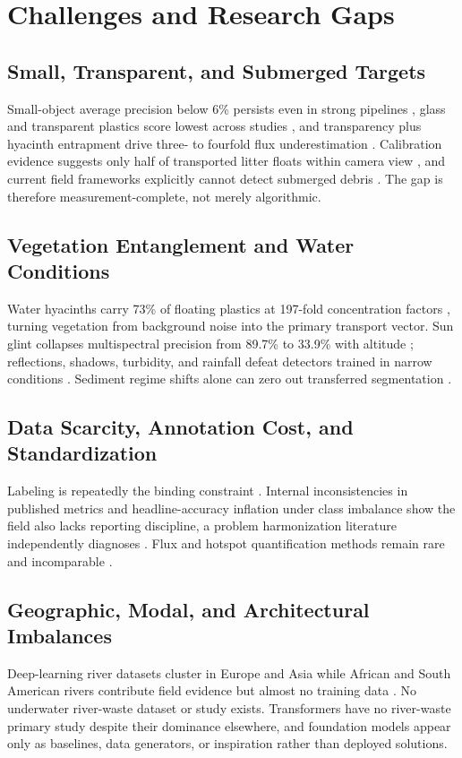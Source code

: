\documentclass[12pt]{article}
\begin{document}
\section{Challenges and Research Gaps}
\label{sec:challenges}

\subsection{Small, Transparent, and Submerged Targets}
Small-object average precision below 6\% persists even in strong pipelines \cite{Tharani2021}, glass and transparent plastics score lowest across studies \cite{Nunkhaw2024}, and transparency plus hyacinth entrapment drive three- to fourfold flux underestimation \cite{JiaFlux2025}. Calibration evidence suggests only half of transported litter floats within camera view \cite{Wolf2022}, and current field frameworks explicitly cannot detect submerged debris \cite{Nunkhaw2025}. The gap is therefore measurement-complete, not merely algorithmic.

\subsection{Vegetation Entanglement and Water Conditions}
Water hyacinths carry 73\% of floating plastics at 197-fold concentration factors \cite{Saigon2025}, turning vegetation from background noise into the primary transport vector. Sun glint collapses multispectral precision from 89.7\% to 33.9\% with altitude \cite{Cortesi2022}; reflections, shadows, turbidity, and rainfall defeat detectors trained in narrow conditions \cite{Lin2021,Tharani2021,Putra2021,Lee2025}. Sediment regime shifts alone can zero out transferred segmentation \cite{SoleGomez2022}.

\subsection{Data Scarcity, Annotation Cost, and Standardization}
Labeling is repeatedly the binding constraint \cite{Jia2023,JiaFrontiers2023,Lin2021}. Internal inconsistencies in published metrics and headline-accuracy inflation under class imbalance \cite{Mohsen2023} show the field also lacks reporting discipline, a problem harmonization literature independently diagnoses \cite{Hurley2023}. Flux and hotspot quantification methods remain rare and incomparable \cite{Lieshout2020,JiaFlux2025}.

\subsection{Geographic, Modal, and Architectural Imbalances}
Deep-learning river datasets cluster in Europe and Asia while African and South American rivers contribute field evidence but almost no training data \cite{Atuhaire2025}. No underwater river-waste dataset or study exists. Transformers have no river-waste primary study despite their dominance elsewhere, and foundation models appear only as baselines, data generators, or inspiration rather than deployed solutions.
\end{document}
